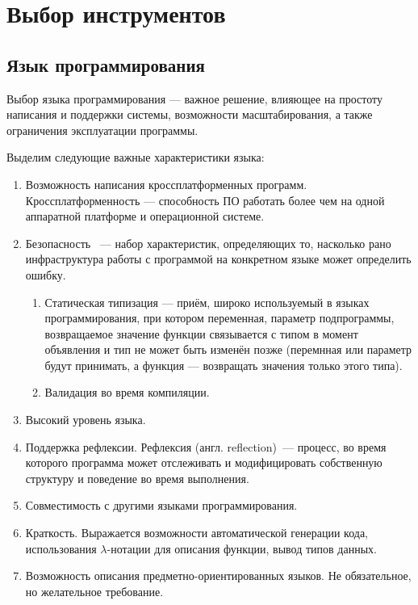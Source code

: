 \chapter{Выбор инструментов} 

\section{Язык программирования}
Выбор языка программирования --- важное решение, влияющее на простоту написания и поддержки системы, возможности масштабирования, а также ограничения эксплуатации программы.

Выделим следующие важные характеристики языка:
\begin{enumerate}
	\item Возможность написания кроссплатформенных программ. Кроссплатформенность --- способность ПО работать более чем на одной аппаратной платформе и операционной системе.
	\item Безопасность ~--- набор характеристик, определяющих то, насколько рано инфраструктура работы с программой на конкретном языке может определить ошибку. 
	\begin{enumerate}
		\item Статическая типизация — приём, широко используемый в языках программирования, при котором переменная, параметр подпрограммы, возвращаемое значение функции связывается с типом в момент объявления и тип не может быть изменён позже (перемнная или параметр будут принимать, а функция — возвращать значения только этого типа).
		\item Валидация во время компиляции.
	\end{enumerate}
	\item Высокий уровень языка.
	\item Поддержка рефлексии. Рефлексия (англ. reflection)~--- процесс, во время которого программа может отслеживать и модифицировать собственную структуру и поведение во время выполнения.
	\item Совместимость с другими языками программирования. 
	\item Краткость. Выражается возможности автоматической генерации кода, использования $ \lambda $-нотации для описания функции, вывод типов данных.
	\item Возможность описания предметно-ориентированных языков. Не обязательное, но желательное требование.
\end{enumerate}

